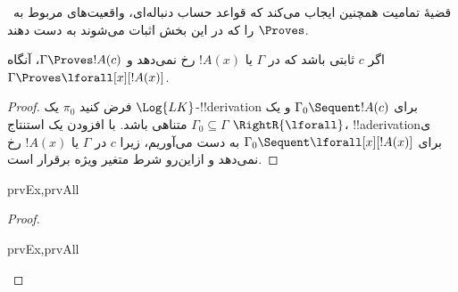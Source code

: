 \documentclass[../../../include/open-logic-section]{subfiles}
\begin{document}

\begin{explain}
  قضیهٔ تمامیت همچنین ایجاب می‌کند که قواعد حساب دنباله‌ای، واقعیت‌های
  مربوط به~$\Proves$ را که در این بخش اثبات می‌شوند به دست دهند.
\end{explain}

\begin{thm}
 اگر $c$ ثابتی باشد که در
$\Gamma$ یا $!A(x)$ رخ نمی‌دهد و $\Gamma \Proves !A(c)$، آنگاه
$\Gamma \Proves \lforall[x][!A(x)]$.
\end{thm}

\begin{proof}
فرض کنید $\pi_0$ یک $\Log{LK}$-!!{derivation} برای
$\Gamma_0 \Sequent !A(c)$ و یک $\Gamma_0 \subseteq \Gamma$ متناهی
باشد. با افزودن یک استنتاج $\RightR{\lforall}$،
!!a{derivation}ی برای $\Gamma_0 \Sequent \lforall[x][!A(x)]$ به دست
می‌آوریم، زیرا $c$ در $\Gamma$ یا $!A(x)$ رخ نمی‌دهد و ازاین‌رو شرط
متغیر ویژه برقرار است.
\end{proof}

\begin{prop}
\begin{tagenumerate}{prvEx,prvAll}
\end{tagenumerate}
\end{prop}

\begin{proof}
\begin{tagenumerate}{prvEx,prvAll}
\end{tagenumerate}
\end{proof}
\end{document}
